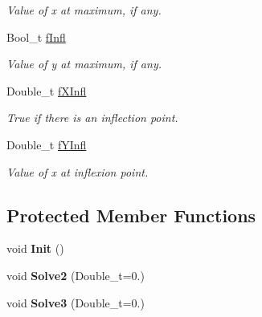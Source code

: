 \begin{DoxyCompactItemize}
\begin{DoxyCompactList}\small\item\em Value of x at maximum, if any. \end{DoxyCompactList}\item 
\hypertarget{classTPoly3_aae8153cdba426b8389b661107005fe3f}{Bool\-\_\-t \hyperlink{classTPoly3_aae8153cdba426b8389b661107005fe3f}{f\-Infl}}\label{classTPoly3_aae8153cdba426b8389b661107005fe3f}

\begin{DoxyCompactList}\small\item\em Value of y at maximum, if any. \end{DoxyCompactList}\item 
\hypertarget{classTPoly3_adfc4327bf88f87d341113de3c20d9823}{Double\-\_\-t \hyperlink{classTPoly3_adfc4327bf88f87d341113de3c20d9823}{f\-X\-Infl}}\label{classTPoly3_adfc4327bf88f87d341113de3c20d9823}

\begin{DoxyCompactList}\small\item\em True if there is an inflection point. \end{DoxyCompactList}\item 
\hypertarget{classTPoly3_a7796c7247db318900594e0922047171b}{Double\-\_\-t \hyperlink{classTPoly3_a7796c7247db318900594e0922047171b}{f\-Y\-Infl}}\label{classTPoly3_a7796c7247db318900594e0922047171b}

\begin{DoxyCompactList}\small\item\em Value of x at inflexion point. \end{DoxyCompactList}\end{DoxyCompactItemize}
\subsection*{Protected Member Functions}
\begin{DoxyCompactItemize}
\item 
\hypertarget{classTPoly3_afc59f60e93db4aab333d9511ba50768d}{void {\bfseries Init} ()}\label{classTPoly3_afc59f60e93db4aab333d9511ba50768d}

\item 
\hypertarget{classTPoly3_a85a916b893df2be2ee3ef91f37e9b615}{void {\bfseries Solve2} (Double\-\_\-t=0.)}\label{classTPoly3_a85a916b893df2be2ee3ef91f37e9b615}

\item 
\hypertarget{classTPoly3_ac16b10b530319fd21fec63c69472f82f}{void {\bfseries Solve3} (Double\-\_\-t=0.)}\label{classTPoly3_ac16b10b530319fd21fec63c69472f82f}

\end{DoxyCompactItemize}
